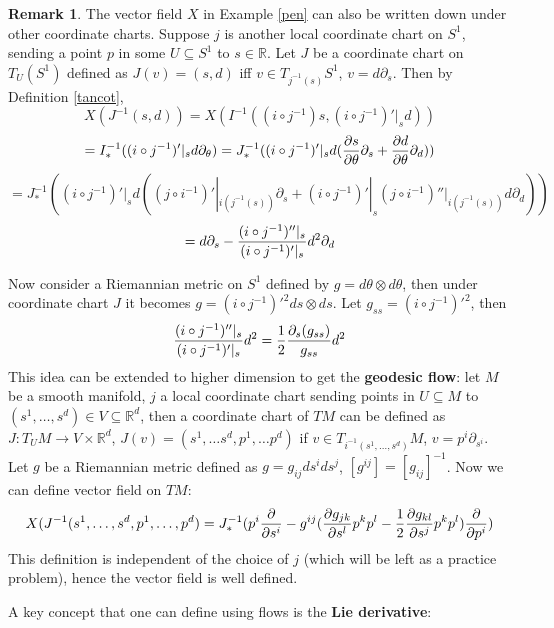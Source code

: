 \documentclass{article}
\theoremstyle{definition}
\newtheorem{rmk}[thm]{Remark}
\begin{document}
\begin{rmk}\label{geodesic}
    The vector field $X$ in Example \ref{pen} can also be written down under other coordinate charts. Suppose $j$ is another local coordinate chart on $S^1$, sending a point $p$ in some $U\subseteq S^1$ to $s\in \mathbb{R}$. Let $J$ be a coordinate chart on $T_U(S^1)$ defined as $J(v)=(s, d)$ iff $v\in T_{j^{-1}(s)}S^1$, $v=d\partial_s$. Then by Definition \ref{tancot},
    \[X(J^{-1}(s, d))=X(I^{-1}((i\circ j^{-1})s, (i\circ j^{-1})'|_s d))\]
    \[=I^{-1}_*((i\circ j^{-1})'|_s d\partial_\theta)=J^{-1}_*((i\circ j^{-1})'|_s d({\partial s\over\partial \theta}\partial_s+{\partial d\over\partial \theta}\partial_d))\]
    \[=J^{-1}_*((i\circ j^{-1})'|_s d((j\circ i^{-1})'|_{i(j^{-1}(s))}\partial_s+(i\circ j^{-1})'|_s (j\circ i^{-1})''|_{i(j^{-1}(s))}d\partial_d))\]
    \[=d\partial_s-{(i\circ j^{-1})''|_s\over (i\circ j^{-1})'|_s} d^2\partial_d\]

    Now consider a Riemannian metric on $S^1$ defined by $g=d\theta\otimes d\theta$, then under coordinate chart $J$ it becomes $g=(i\circ j^{-1})'^2 ds\otimes ds$. Let $g_{ss}=(i\circ j^{-1})'^2$, then 
    \[{(i\circ j^{-1})''|_s\over (i\circ j^{-1})'|_s} d^2={1\over 2}{\partial_s(g_{ss})\over g_{ss}}d^2\]
    This idea can be extended to higher dimension to get the {\bf geodesic flow}: let $M$ be a smooth manifold, $j$ a local coordinate chart sending points in $U\subseteq M$ to $(s^1, \dots, s^d)\in V\subseteq \mathbb{R}^d$, then a coordinate chart of $TM$ can be defined as $J: T_UM\rightarrow V\times\mathbb{R}^d$, $J(v)=(s^1, \dots s^d, p^1, \dots p^d)$ if $v\in T_{i^{-1}(s^1, \dots, s^d)}M$, $v=p^i\partial_{s^i}$. Let $g$ be a Riemannian metric defined as $g=g_{ij}ds^ids^j$, $[g^{ij}]=[g_{ij}]^{-1}$. Now we can define vector field on $TM$:
    \[X(J^{-1}(s^1,\dots, s^d, p^1,\dots, p^d)=J^{-1}_*(p^i{\partial\over \partial{s^i}}-g^{ij}({\partial g_{jk}\over\partial s^l}p^kp^l-{1\over 2}{\partial g_{kl}\over\partial s^j}p^kp^l){\partial\over \partial p^i})\]
    This definition is independent of the choice of $j$ (which will be left as a practice problem), hence the vector field is well defined.  
\end{rmk}

A key concept that one can define using flows is the {\bf Lie derivative}:
\end{document}
